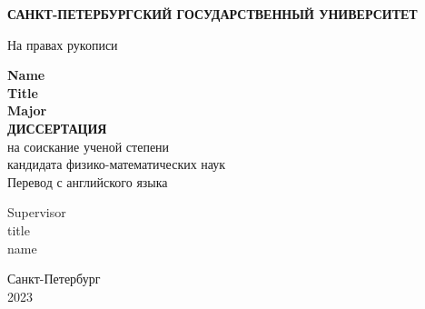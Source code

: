 \thispagestyle{empty}
\begin{center}
{\textbf{САНКТ-ПЕТЕРБУРГСКИЙ ГОСУДАРСТВЕННЫЙ УНИВЕРСИТЕТ}}\\
\vskip 20pt

\begin{flushleft}
\hskip 360pt { 
На правах рукописи
}
\end{flushleft}
\vskip 80pt
{\textbf{\Large Name}}\\
\vskip 60pt
{\LARGE \textbf{
Title}}\\
\vskip 25pt
\textbf{\large Major}\\
\vskip 40pt
\textbf{\Large ДИССЕРТАЦИЯ} \\
\vskip 40pt
на соискание ученой степени \\
кандидата физико-математических наук\\
Перевод с английского языка
\vskip 50pt
\begin{flushleft}
\hskip 305pt {\Large Supervisor
}\\
\vskip 5pt
\hskip 305pt {\Large title}\\
\vskip 5pt
\hskip 305pt {\Large name}
\end{flushleft}

\vskip 60pt
Санкт-Петербург\\
\vskip 10pt
2023
\end{center}
